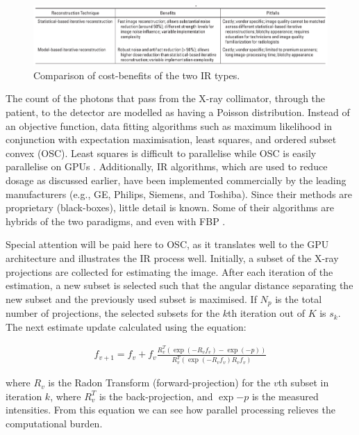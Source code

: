 \documentclass{bmcart}
\begin{document}
\begin{figure}[h!] 
  \includegraphics[scale=.39]{figures/patino_ir.png}
  \caption{ Comparison of cost-benefits of the two IR types.}
  \label{fig:ir_table}
\end{figure}
The count of the photons that pass from the X-ray collimator, through the patient, to the detector are modelled as having a Poisson distribution. Instead of an objective function, data fitting algorithms such as maximum likelihood in conjunction with expectation maximisation, least squares, and ordered subset convex (OSC). Least squares is difficult to parallelise while OSC is easily parallelise on GPUs \cite{beister_iterative_2012}. Additionally, IR algorithms, which are used to reduce dosage as discussed earlier, have been implemented commercially by the leading manufacturers (e.g., GE, Philips, Siemens, and Toshiba). Since their methods are proprietary (black-boxes), little detail is known. Some of their algorithms are hybrids of the two paradigms, and even with FBP \cite{geyer_state_2015}.
\par Special attention will be paid here to OSC, as it translates well to the GPU architecture and illustrates the IR process well. Initially, a subset of the X-ray projections are collected for estimating the image. After each iteration of the estimation, a new subset is selected such that the angular distance separating the new subset and the previously used subset is maximised. If $N_p$ is the total number of projections, the selected subsets for the $k$th iteration out of $K$ is $s_k$. The next estimate update calculated using the equation:
\begin{ceqn}
\begin{align}
    f_{v+1}=f_v+f_v{\frac{R_{v}^{T}(\exp{(-R_v f_v)}-\exp{(-p)})}{R_{v}^{T}(\exp{(-R_v f_v)}R_v f_v)}}
\end{align}
\end{ceqn}
where $R_v$ is the Radon Transform (forward-projection) for the $v$th subset in iteration $k$, where $R_{v}^{T}$ is the back-projection, and $\exp{-p}$ is the measured intensities. From this equation we can see how parallel processing relieves the computational burden.
\end{document}
